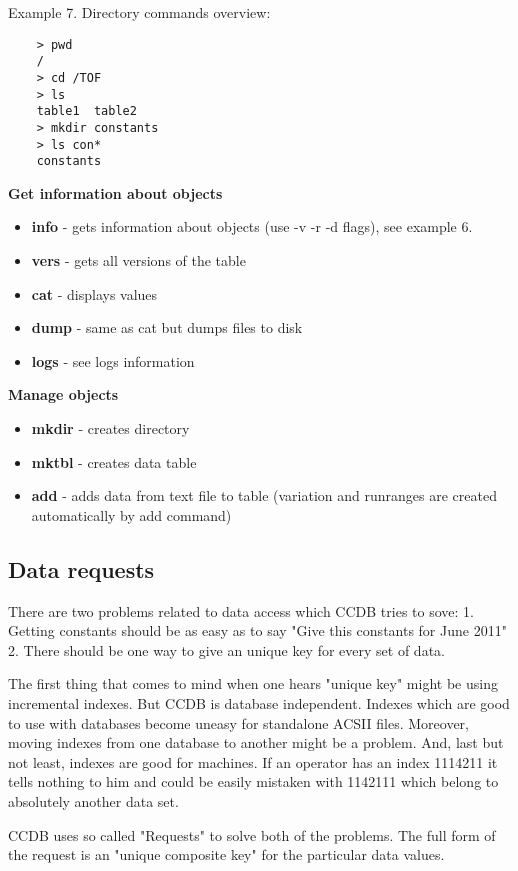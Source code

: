 \documentclass{article}
\begin{document}
Example 7. Directory commands overview:
\begin{verbatim}
    > pwd
    /
	> cd /TOF
	> ls
    table1  table2
	> mkdir constants
	> ls con*
    constants
\end{verbatim}



\textbf{Get information about objects}
\begin{itemize}
  \item \textbf{info} - gets information about objects (use -v -r -d flags), see example 6.
  \item \textbf{vers} - gets all versions of the table
  \item \textbf{cat}  - displays values
  \item \textbf{dump} - same as cat but dumps files to disk
  \item \textbf{logs} - see logs information
\end{itemize}


\textbf{Manage objects}
\begin{itemize}
  \item \textbf{mkdir} - creates directory
  \item \textbf{mktbl} - creates data table
  \item \textbf{add} - adds data from text file to table
        (variation and runranges are created automatically by add command)
\end{itemize}


\subsection{Data requests}

There are two problems related to data access which CCDB tries to sove:
1. Getting constants should be as easy as to say "Give this constants for June 2011"
2. There should be one way to give an unique key for every set of data.

The first thing that comes to mind when one hears "unique key" might be
using incremental indexes. But CCDB is database independent. Indexes
which are good to use with databases become uneasy for standalone ACSII files.
Moreover, moving indexes from one database to another might be a problem.
And, last but not least, indexes are good for machines. If an operator
has an index 1114211 it tells nothing to him and could be easily
mistaken with 1142111 which belong to absolutely another data set.

CCDB uses so called "Requests" to solve both of the problems.
The full form of the request is an "unique composite key" for
the particular data values.
\end{document}
